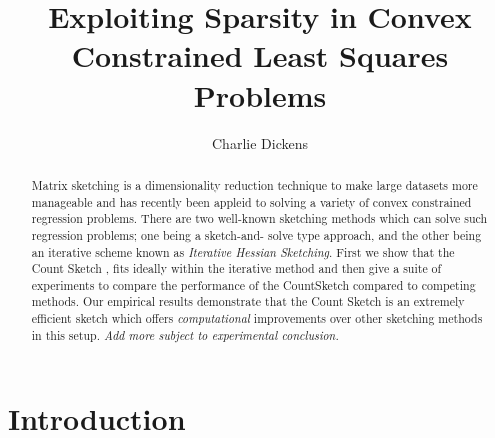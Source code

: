 \documentclass[twoside]{article}
\title{Exploiting Sparsity in Convex Constrained Least Squares Problems}
\author{Charlie Dickens}
\date{}
\theoremstyle{definition}\newtheorem{thm}{Theorem}[section]
\theoremstyle{definition}\newtheorem{mydef}[thm]{Definition}
\theoremstyle{definition}\newtheorem{rem}[thm]{Remark}
\theoremstyle{definition}\newtheorem{prop}[thm]{Proposition}
\theoremstyle{definition}\newtheorem{example}[thm]{Example}
\theoremstyle{definition}\newtheorem{claim}[thm]{Claim}
\theoremstyle{definition}\newtheorem{Qu}[thm]{Question}
\theoremstyle{definition}\newtheorem{Lemma}[thm]{Lemma}
\theoremstyle{definition}\newtheorem{Cor}[thm]{Corollary}
\theoremstyle{definition}\newtheorem{Fact}[]{Fact}
\begin{document}
\maketitle

%

%





\begin{abstract}
  Matrix sketching is a dimensionality reduction technique to make large datasets
  more manageable and has recently been appleid to solving a variety of
  convex constrained regression problems.
  There are two well-known sketching methods which can solve such
  regression problems; one being a sketch-and-
  solve type approach, and the other being an iterative scheme known as \textit{
  Iterative Hessian Sketching}.
  First we show that the
  Count Sketch \cite{clarkson2013low}, fits ideally within the iterative method
  and then give a suite of experiments to compare the performance of
  the CountSketch compared to competing methods.
  Our empirical results demonstrate that the Count Sketch is an extremely efficient
  sketch which offers \textit{computational} improvements over other sketching
  methods in this setup.
  \textit{Add more subject to experimental conclusion.}
\end{abstract}

\section{Introduction} \label{sec: intro}

\end{document}
